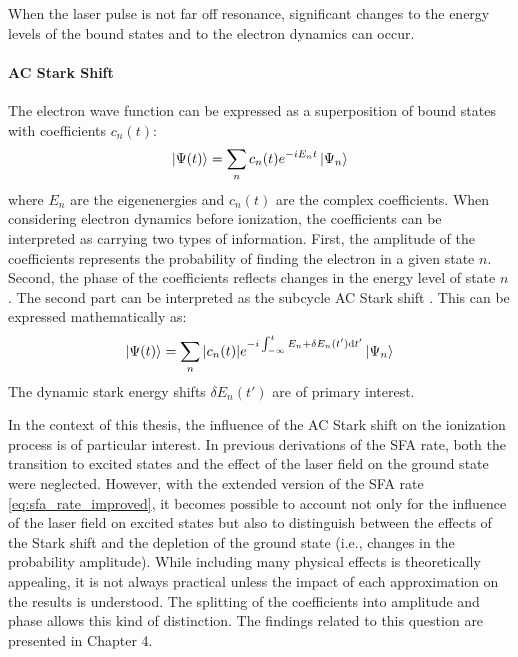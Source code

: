 When the laser pulse is not far off resonance, significant changes to the energy levels of the bound states and to the electron dynamics can occur.

\paragraph{AC Stark Shift}
The electron wave function can be expressed as a superposition of bound states with coefficients $c_n(t)$:
\begin{equation*}
    \ket{\Psi(t)} = \sum_n c_n(t) e^{-iE_nt}\ket{\Psi_n}
\end{equation*}
where $E_n$ are the eigenenergies and $c_n(t)$ are the complex coefficients.
When considering electron dynamics before ionization, the coefficients can be interpreted as carrying two types of information.
First, the amplitude of the coefficients represents the probability of finding the electron in a given state $n$.
Second, the phase of the coefficients reflects changes in the energy level of state $n$.
The second part can be interpreted as the subcycle AC Stark shift \cite{subsycleacstarkshift}.
This can be expressed mathematically as:
\begin{equation}
    \ket{\Psi(t)} = \sum_n |c_n(t)| e^{-i\int_{-\infty}^{t}E_n + \delta E_n(t')\mathrm{d} t'}\ket{\Psi_n}      \label{eq:ac_stark_shift}
\end{equation}
The dynamic stark energy shifts $\delta E_n(t')$ are of primary interest.

\bigskip
In the context of this thesis, the influence of the AC Stark shift on the ionization process is of particular interest.
In previous derivations of the SFA rate, both the transition to excited states and the effect of the laser field on the ground state were neglected.
However, with the extended version of the SFA rate \eqref{eq:sfa_rate_improved}, it becomes possible to account not only for the influence of the laser field on excited states but also to distinguish between the effects of the Stark shift and the depletion of the ground state (i.e., changes in the probability amplitude).
While including many physical effects is theoretically appealing, it is not always practical unless the impact of each approximation on the results is understood.
The splitting of the coefficients into amplitude and phase allows this kind of distinction.
The findings related to this question are presented in Chapter 4.